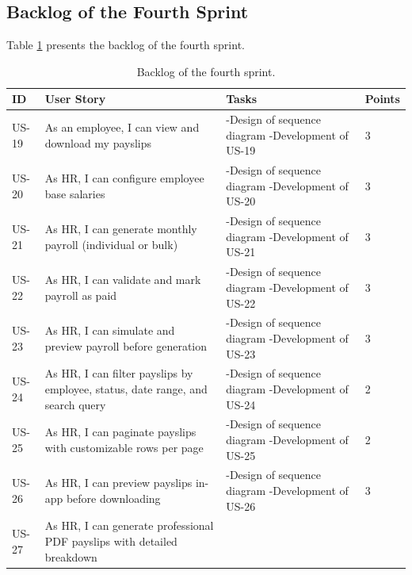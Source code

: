 \subsection{Backlog of the Fourth Sprint}
Table \ref{tab:payroll-backlog} presents the backlog of the fourth sprint.

\begin{longtable}{
    |p{}
    |p{}|
    p{}|
    p{}| 
}
    \caption{Backlog of the fourth sprint.}
    \label{tab:payroll-backlog}\\
    \hline
    ID & User Story & Tasks & Points \\
    \hline
    US-19 & As an employee, I can view and download my payslips
    & -Design of sequence diagram\newline
-Development of US-19 & 3 \\
    \hline
    US-20 & As HR, I can configure employee base salaries
    & -Design of sequence diagram\newline
-Development of US-20 & 3 \\
    \hline
    US-21 & As HR, I can generate monthly payroll (individual or bulk)
    & -Design of sequence diagram\newline
-Development of US-21 & 3 \\
    \hline
    US-22 & As HR, I can validate and mark payroll as paid
    & -Design of sequence diagram\newline
-Development of US-22 & 3 \\
    \hline
    US-23 & As HR, I can simulate and preview payroll before generation
    & -Design of sequence diagram\newline
-Development of US-23 & 3 \\
    \hline
    US-24 & As HR, I can filter payslips by employee, status, date range, and search query
    & -Design of sequence diagram\newline
-Development of US-24 & 2 \\
    \hline
    US-25 & As HR, I can paginate payslips with customizable rows per page
    & -Design of sequence diagram\newline
-Development of US-25 & 2 \\
    \hline
    US-26 & As HR, I can preview payslips in-app before downloading
    & -Design of sequence diagram\newline
-Development of US-26 & 3 \\
    \hline
    US-27 & As HR, I can generate professional PDF payslips with detailed breakdown

\end{longtable}
